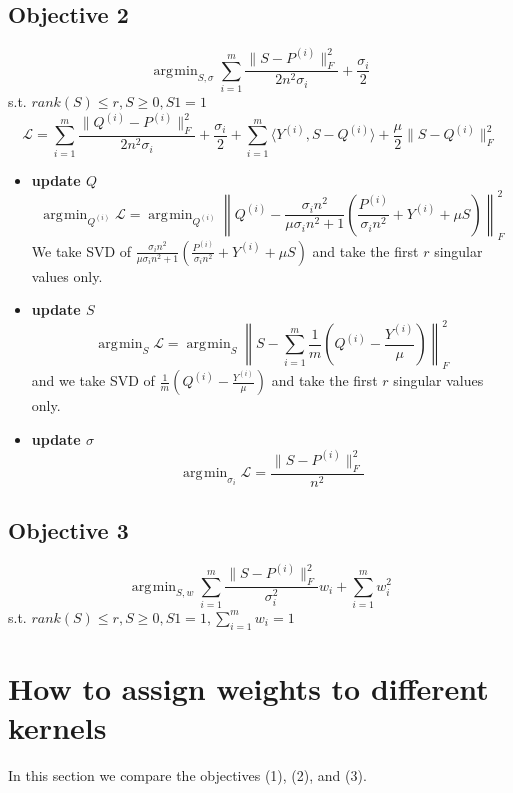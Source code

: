 \documentclass[11pt]{article}
\newcommand{\norm}[1]{\left\lVert#1\right\rVert}
\DeclareMathOperator*{\argmin}{\arg\!\min}
\begin{document}
\subsection*{Objective 2}
\begin{equation}
\argmin_{S, \sigma} \sum_{i=1}^{m} \frac{\|S - P^{(i)} \|_F^2}{2n^2\sigma_i} + \frac{\sigma_i}{2}
\end{equation}
s.t. $rank(S) \leq r, S \geq 0, S1 = 1$
$$\mathcal{L} = \sum_{i=1}^{m} \frac{\|Q^{(i)} - P^{(i)}\|^2_F}{2n^2 \sigma_i} + \frac{\sigma_i}{2} + \sum_{i=1}^{m} \langle Y^{(i)}, S-Q^{(i)} \rangle + \frac{\mu}{2} \|S-Q^{(i)}\|_F^2$$
\begin{itemize}
\item \textbf{update $Q$}
$$\argmin_{Q^{(i)}} \mathcal{L} = \argmin_{Q^{(i)}} \norm{
Q^{(i)} - \frac{\sigma_i n^2}{\mu \sigma_i n^2 + 1}\left(
\frac{P^{(i)}}{\sigma_i n^2} + Y^{(i)} + \mu S
\right)
}_F^2$$
We take SVD of $\frac{\sigma_i n^2}{\mu \sigma_i n^2 + 1}\left(
\frac{P^{(i)}}{\sigma_i n^2} + Y^{(i)} + \mu S \right)$ and take the first $r$ singular values only. 

\item  \textbf{update $S$}
$$\argmin_S \mathcal{L} = 
\argmin_S \norm{
S -
\sum_{i=1}^{m} \frac{1}{m}\left(Q^{(i)} -\frac{ Y^{(i)}}{\mu}
\right)
}_F^2
$$
and we take SVD of $\frac{1}{ m}\left(Q^{(i)} - \frac{Y^{(i)}}{\mu}
\right)$ and take the first $r$ singular values only.

\item  \textbf{update $\sigma$}
$$\argmin_{\sigma_i} \mathcal{L} = \frac{\|S-P^{(i)}\|_F^2}{n^2}$$
\end{itemize}

\subsection*{Objective 3}
\begin{equation}
\argmin_{S, w} \sum_{i=1}^{m} \frac{\|S-P^{(i)}\|_F^2}{\sigma_i^2} w_i + \sum_{i=1}^{m} w_i^2
\end{equation}
s.t. $rank(S) \leq r, S \geq 0, S1 = 1, \sum_{i=1}^{m} w_i = 1$







\section*{How to assign weights to different kernels}
In this section we compare the objectives (1), (2), and (3). \\
\end{document}
